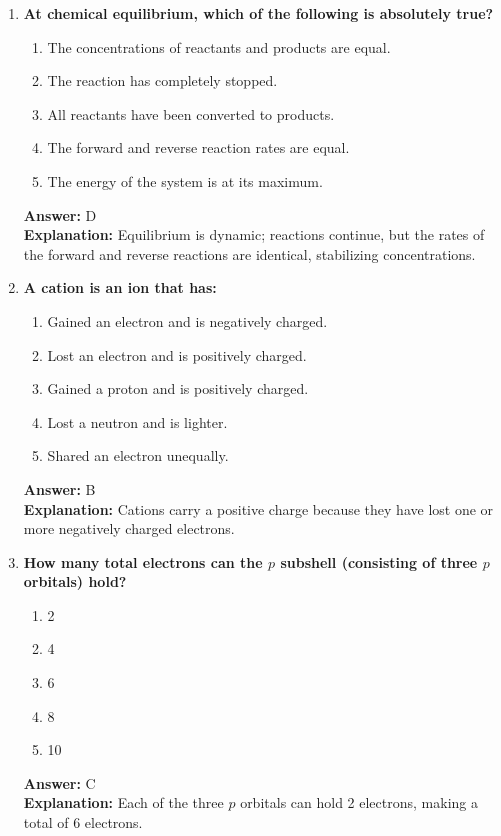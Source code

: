 \documentclass[11pt, a4paper]{article}
\begin{document}
\begin{enumerate}
\item \textbf{At chemical equilibrium, which of the following is absolutely true?}
\begin{enumerate}[label=\Alph*.]
    \item The concentrations of reactants and products are equal.
    \item The reaction has completely stopped.
    \item All reactants have been converted to products.
    \item The forward and reverse reaction rates are equal.
    \item The energy of the system is at its maximum.
\end{enumerate}
\textbf{Answer:} D \\
\textbf{Explanation:} Equilibrium is dynamic; reactions continue, but the rates of the forward and reverse reactions are identical, stabilizing concentrations.

\item \textbf{A cation is an ion that has:}
\begin{enumerate}[label=\Alph*.]
    \item Gained an electron and is negatively charged.
    \item Lost an electron and is positively charged.
    \item Gained a proton and is positively charged.
    \item Lost a neutron and is lighter.
    \item Shared an electron unequally.
\end{enumerate}
\textbf{Answer:} B \\
\textbf{Explanation:} Cations carry a positive charge because they have lost one or more negatively charged electrons.

\item \textbf{How many total electrons can the $p$ subshell (consisting of three $p$ orbitals) hold?}
\begin{enumerate}[label=\Alph*.]
    \item 2
    \item 4
    \item 6
    \item 8
    \item 10
\end{enumerate}
\textbf{Answer:} C \\
\textbf{Explanation:} Each of the three $p$ orbitals can hold 2 electrons, making a total of 6 electrons.


\end{enumerate}
\end{document}
